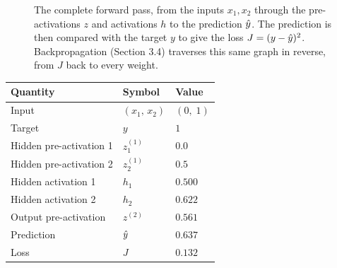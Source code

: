 \documentclass[12pt, a4paper]{article}
\begin{document}
\begin{figure}[H]
  \caption{The complete forward pass, from the inputs $x_1, x_2$ through the
    pre-activations $z$ and activations $h$ to the prediction $\hat{y}$. The
    prediction is then compared with the target $y$ to give the loss
    $J = (y - \hat{y})^2$. Backpropagation (Section 3.4) traverses this same
    graph in reverse, from $J$ back to every weight.}
  \label{fig:forward-pass-z-with-loss}
\end{figure}

\begin{center}
  \renewcommand{\arraystretch}{1.4}
  \begin{tabular}{lll}
    \toprule
    Quantity                & Symbol         & Value      \\
    \midrule
    Input                   & $(x_1,\, x_2)$ & $(0,\; 1)$ \\
    Target                  & $y$            & $1$        \\
    \midrule
    Hidden pre-activation 1 & $z^{(1)}_1$    & $0.0$      \\
    Hidden pre-activation 2 & $z^{(1)}_2$    & $0.5$      \\
    Hidden activation 1     & $h_1$          & $0.500$    \\
    Hidden activation 2     & $h_2$          & $0.622$    \\
    \midrule
    Output pre-activation   & $z^{(2)}$      & $0.561$    \\
    Prediction              & $\hat{y}$        & $0.637$    \\
    \midrule
    Loss                    & $J$            & $0.132$    \\
    \bottomrule
  \end{tabular}
\end{center}
\end{document}
